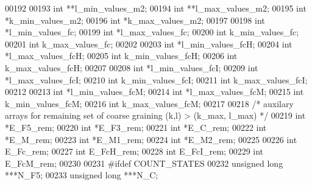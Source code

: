 \begin{DoxyCode}
00192 
00193   \textcolor{keywordtype}{int}                   **l\_min\_values\_m2;
00194   \textcolor{keywordtype}{int}                   **l\_max\_values\_m2;
00195   \textcolor{keywordtype}{int}                   *k\_min\_values\_m2;
00196   \textcolor{keywordtype}{int}                   *k\_max\_values\_m2;
00197 
00198   \textcolor{keywordtype}{int}                   *l\_min\_values\_fc;
00199   \textcolor{keywordtype}{int}                   *l\_max\_values\_fc;
00200   \textcolor{keywordtype}{int}                   k\_min\_values\_fc;
00201   \textcolor{keywordtype}{int}                   k\_max\_values\_fc;
00202 
00203   \textcolor{keywordtype}{int}                   *l\_min\_values\_fcH;
00204   \textcolor{keywordtype}{int}                   *l\_max\_values\_fcH;
00205   \textcolor{keywordtype}{int}                   k\_min\_values\_fcH;
00206   \textcolor{keywordtype}{int}                   k\_max\_values\_fcH;
00207 
00208   \textcolor{keywordtype}{int}                   *l\_min\_values\_fcI;
00209   \textcolor{keywordtype}{int}                   *l\_max\_values\_fcI;
00210   \textcolor{keywordtype}{int}                   k\_min\_values\_fcI;
00211   \textcolor{keywordtype}{int}                   k\_max\_values\_fcI;
00212 
00213   \textcolor{keywordtype}{int}                   *l\_min\_values\_fcM;
00214   \textcolor{keywordtype}{int}                   *l\_max\_values\_fcM;
00215   \textcolor{keywordtype}{int}                   k\_min\_values\_fcM;
00216   \textcolor{keywordtype}{int}                   k\_max\_values\_fcM;
00217 
00218   \textcolor{comment}{/* auxilary arrays for remaining set of coarse graining (k,l) > (k\_max, l\_max) */}
00219   \textcolor{keywordtype}{int}                   *E\_F5\_rem;
00220   \textcolor{keywordtype}{int}                   *E\_F3\_rem;
00221   \textcolor{keywordtype}{int}                   *E\_C\_rem;
00222   \textcolor{keywordtype}{int}                   *E\_M\_rem;
00223   \textcolor{keywordtype}{int}                   *E\_M1\_rem;
00224   \textcolor{keywordtype}{int}                   *E\_M2\_rem;
00225 
00226   \textcolor{keywordtype}{int}                   E\_Fc\_rem;
00227   \textcolor{keywordtype}{int}                   E\_FcH\_rem;
00228   \textcolor{keywordtype}{int}                   E\_FcI\_rem;
00229   \textcolor{keywordtype}{int}                   E\_FcM\_rem;
00230 
00231 \textcolor{preprocessor}{#ifdef COUNT\_STATES}
00232   \textcolor{keywordtype}{unsigned} \textcolor{keywordtype}{long}         ***N\_F5;
00233   \textcolor{keywordtype}{unsigned} \textcolor{keywordtype}{long}         ***N\_C;

\end{DoxyCode}
